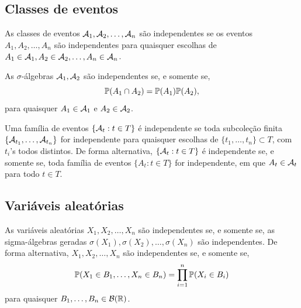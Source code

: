 \subsection{Classes de eventos}

\begin{definition}
	As classes de eventos $\Acal_1, \Acal_2, \ldots, \Acal_n$ são independentes se os eventos $A_1, A_2, \ldots, A_n$ são independentes para quaisquer escolhas de $A_1\in\Acal_1, A_2\in\Acal_2, \ldots, A_n\in\Acal_n$.
\end{definition}
\begin{note}
	As $\sigma$-álgebras $\Acal_1, \Acal_2$ são independentes se, e somente se,
	\begin{equation}
		\P(A_1\cap A_2) = \P(A_1) \P(A_2),
	\end{equation}
	para quaisquer $A_1\in\Acal_1$ e $A_2\in\Acal_2$.
\end{note}


\begin{definition}
	\leavevmode
	\begin{outline}
		\1 Uma família de eventos $\{\Acal_t: t \in T\}$ é independente se toda subcoleção finita $\{\Acal_{t_1}, \ldots, \Acal_{t_n}\}$ for independente para quaisquer escolhas de $\{t_1, \ldots, t_n\}\subset T$, com $t_i$'s todos distintos.
		\1 De forma alternativa, $\{\Acal_t: t \in T\}$ é independente se, e somente se, toda família de eventos $\{A_t: t \in T\}$ for independente, em que $A_t \in \Acal_t$ para todo $t \in T$.
	\end{outline}

\end{definition}

\subsection{Variáveis aleatórias}

\begin{definition}
	\leavevmode
	\begin{outline}
		\1 As variáveis aleatórias $X_1, X_2, \ldots, X_n$ são independentes se, e somente se, as sigma-álgebras geradas $\sigma(X_1), \sigma(X_2), \ldots, \sigma(X_n)$ são independentes.
		\1 De forma alternativa, $X_1, X_2, \ldots, X_n$ são independentes se, e somente se,
		\begin{equation}
			\P(X_1\in B_1, \ldots, X_n \in B_n) = \prod_{i=1}^{n}\P(X_i \in B_i)
		\end{equation}
		para quaisquer $B_1, \ldots,B_n \in \Bo$.
	\end{outline}
\end{definition}

